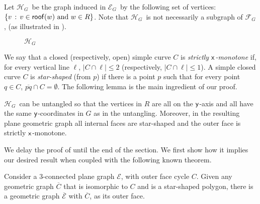 \documentclass[lotsofwhite,charterfonts, letter]{patmorin}
\newcommand{\Figure}[4][htb]{
\begin{figure}[#1]
  \vspace*{1ex}
  \begin{center}#3\end{center}
	\vspace*{-2ex}
	\caption{\figlabel{#2}#4}
\end{figure}}
\newcommand{\x}{\ensuremath{\protect\textup{\textsf{x}}}}
\newcommand{\y}{\ensuremath{\protect\textup{\textsf{y}}}}
\newcommand{\eg}{\ensuremath{\mathcal{E}_G}}
\newcommand{\fg}{\ensuremath{\mathcal{F}_G}}
\newcommand{\hg}{\ensuremath{\mathcal{H}_G}}
\newcommand{\rf}[1]{\ensuremath{\textup{\textsf{roof}}(#1)}}
\begin{document}
Let \hg\ be the graph induced in \eg\ by the following set of vertices: $\{v\,:\, v\in\rf{w}\ \textup{and}\ w\in R\}$. Note that \hg\ is not necessarily a subgraph of \fg, (as illustrated in ).
%
\Figure{hg}{%
}{\hg}
%
We say that a closed (respectively, open) simple curve $C$ is \emph{strictly
\x-monotone} if, for every vertical line $\ell$, $|C\cap\ell| \le 2$
(respectively, $|C\cap\ell| \le 1$).
A simple closed curve $C$ is \emph{star-shaped} (from $p$) if there 
is a point $p$ such that
for every point $q\in C$, $\overline{pq}\cap C =
\emptyset$.
The following lemma is the main ingredient of
our proof. 

\begin{lem}
\hg\ can be untangled so that the vertices in $R$ are all on the
\y-axis and all have the same
\y-coordinates in $G$ as in the untangling. Moreover, in the
resulting plane geometric graph all internal faces are star-shaped and
the outer face is strictly \x-monotone.\end{lem}

We delay the proof of  until the end of the section.
We first show how it implies our desired result when coupled with the
following known theorem.

\begin{thm}\cite{DBLP:conf/wg/HongN06}
Consider a $3$-connected plane graph ${\mathcal E}$, with outer face
cycle $C$. Given any geometric graph $\overline{C}$ that is isomorphic
to $C$ and is a star-shaped polygon, there is a geometric graph 
$\overline{\mathcal E}$ with $\overline{C}$, as its outer face.
\end{thm}
\end{document}
